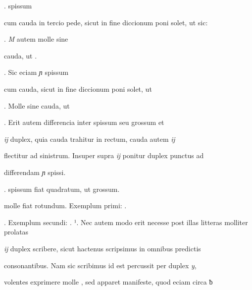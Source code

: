 .  spissum 

\fulllines
cum cauda in tercio pede, sicut in fine diccionum poni solet, ut sic:

     . \textit{M} autem molle sine 

\splitlines
cauda, ut    .

. Sic eciam \textit{ɲ} spissum 

\fulllines

cum cauda, sicut in fine diccionum poni solet, ut  

   . Molle sine cauda, ut 

 . Erit autem differencia inter  spissum seu grossum et

\textit{ĳ} duplex, quia cauda  trahitur in rectum, cauda autem \textit{ĳ}

flectitur ad sinistrum. Insuper supra \textit{ĳ} ponitur duplex punctus ad

\splitlines
differendam \textit{ɲ} spissi.

.  spissum fiat quadratum, ut  grossum. 

\fulllines

 molle fiat rotundum. Exemplum primi:  .  


. Exemplum secundi:    .   ¹.
Nec autem modo erit necesse post illas litteras molliter prolatas 

\textit{ĳ} duplex scribere, sicut hactenus scripsimus in omnibus predictis

consonantibus. Nam sic scribimus  id est percussit per duplex \textit{y},

volentes exprimere molle , sed apparet manifeste, quod eciam circa ƀ


